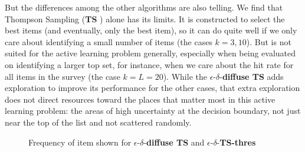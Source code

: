 \documentclass[nonblindrev]{informs3}
\newcommand{\ts}{\textbf{TS} }
\newcommand{\edts}{$\epsilon$-$\delta$-\textbf{diffuse TS} }
\newcommand{\edtsthres}{$\epsilon$-$\delta$-\textbf{TS-thres} }
\begin{document}
But the differences among the other algorithms are also telling. We find that Thompson Sampling (\ts) alone has its limits. It is constructed to select the best items (and eventually, only the best item), so it can do quite well if we only care about identifying a small number of items (the cases $k=3,10$). But is not suited for the active learning problem generally, especially when being evaluated on identifying a larger top set, for instance, when we care about the hit rate for all items in the survey (the case $k=L=20$). While the \edts adds exploration to improve its performance for the other cases, that extra exploration does not direct resources toward the places that matter most in this active learning problem: the areas of high uncertainty at the decision boundary, not just near the top of the list and not scattered randomly.  

\begin{figure}%
    \caption{Frequency of item shown for \edts and \edtsthres}%
    \label{fig:Frequency}%
 	\begin{center}
    \qquad
	\end{center}
\end{figure}
\end{document}
